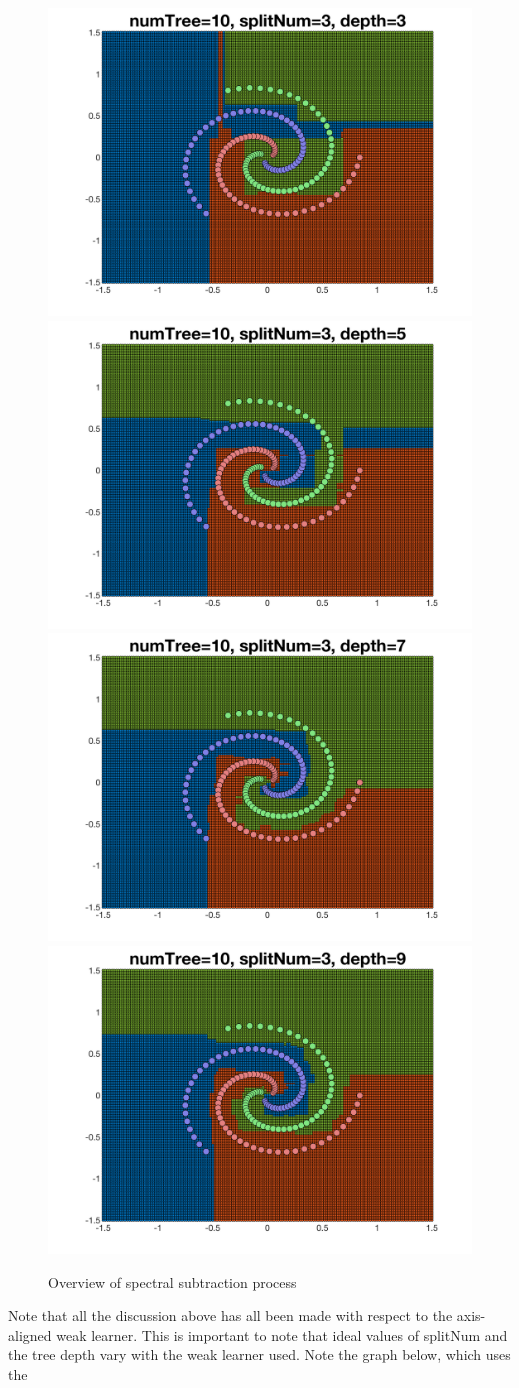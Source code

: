 \documentclass[a4paper,pra,twocolumn,10pt,aps,longbibliography,nobalancelastpage]{revtex4-1}
\begin{document}
\begin{figure}[H]
	\centering
    \includegraphics[width=0.40\columnwidth]{tree_depth_3}
	\includegraphics[width=0.40\columnwidth]{tree_depth_5}
    \includegraphics[width=0.40\columnwidth]{tree_depth_7}
    \includegraphics[width=0.40\columnwidth]{tree_depth_9}
    \caption{Overview of spectral subtraction process}
\end{figure}

Note that all the discussion above has all been made with respect to the axis-aligned weak learner. This is important to note that ideal values of splitNum and the tree depth vary with the weak learner used. Note the graph below, which uses the 
\end{document}
